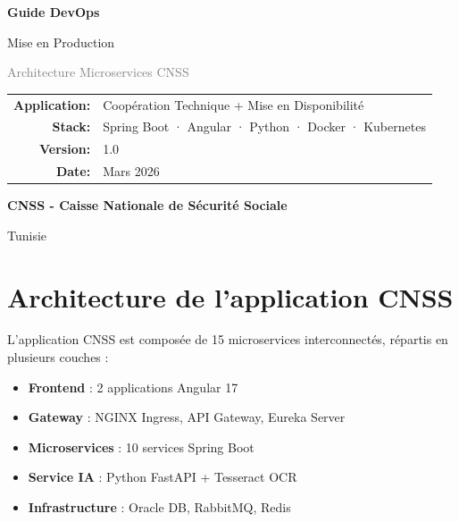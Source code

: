 \documentclass[12pt,a4paper]{article}
\begin{document}
\begin{titlepage}
    \centering
    \vspace*{2cm}
    
    {\Huge\bfseries\textcolor{primary}{Guide DevOps}\par}
    \vspace{0.5cm}
    {\LARGE Mise en Production\par}
    \vspace{1cm}
    {\Large\textcolor{gray}{Architecture Microservices CNSS}\par}
    
    \vspace{2cm}
    
    
    \vspace{2cm}
    
    {\large
    \begin{tabular}{rl}
        \textbf{Application:} & Coopération Technique + Mise en Disponibilité \\[5pt]
        \textbf{Stack:} & Spring Boot · Angular · Python · Docker · Kubernetes \\[5pt]
        \textbf{Version:} & 1.0 \\[5pt]
        \textbf{Date:} & Mars 2026 \\
    \end{tabular}
    }
    
    \vfill
    
    {\Large\bfseries CNSS - Caisse Nationale de Sécurité Sociale\par}
    {\large Tunisie\par}
    
\end{titlepage}

\tableofcontents
\newpage

\section{Architecture de l'application CNSS}

L'application CNSS est composée de 15 microservices interconnectés, répartis en plusieurs couches :

\begin{itemize}[leftmargin=*]
    \item \textbf{Frontend} : 2 applications Angular 17
    \item \textbf{Gateway} : NGINX Ingress, API Gateway, Eureka Server
    \item \textbf{Microservices} : 10 services Spring Boot
    \item \textbf{Service IA} : Python FastAPI + Tesseract OCR
    \item \textbf{Infrastructure} : Oracle DB, RabbitMQ, Redis
\end{itemize}
\end{document}
